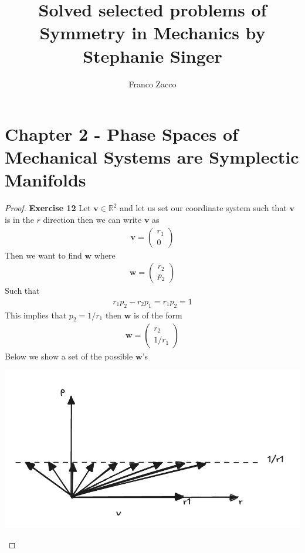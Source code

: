 \documentclass[11pt]{article}
\title{\textbf{Solved selected problems of Symmetry in Mechanics by Stephanie Singer}}
\author{Franco Zacco}
\date{}
\newcommand{\R}{\mathbb{R}}
\theoremstyle{definition}
\begin{document}
\maketitle
\thispagestyle{empty}

\section*{Chapter 2 - Phase Spaces of Mechanical Systems are Symplectic Manifolds}

\begin{proof}{\textbf{Exercise 12}}
    Let $\bm{v} \in \R^2$ and let us set our coordinate system such that
    $\bm{v}$ is in the $r$ direction then we can write $\bm{v}$ as
    \begin{align*}
        \bm{v} = \begin{pmatrix} r_1\\ 0 \end{pmatrix}
    \end{align*}
    Then we want to find $\bm{w}$ where 
    \begin{align*}
        \bm{w} = \begin{pmatrix} r_2\\ p_2 \end{pmatrix}
    \end{align*}
    Such that
    \begin{align*}
        r_1p_2 - r_2p_1 = r_1p_2 = 1
    \end{align*}
    This implies that $p_2 = 1/r_1$ then $\bm{w}$ is of the form
    \begin{align*}
        \bm{w} = \begin{pmatrix} r_2\\ 1/r_1 \end{pmatrix}
    \end{align*}
    Below we show a set of the possible $\bm{w}$'s
    \begin{center}
        \includegraphics[scale=0.4]{ch2-12.png}
    \end{center}
\end{proof}
\end{document}
